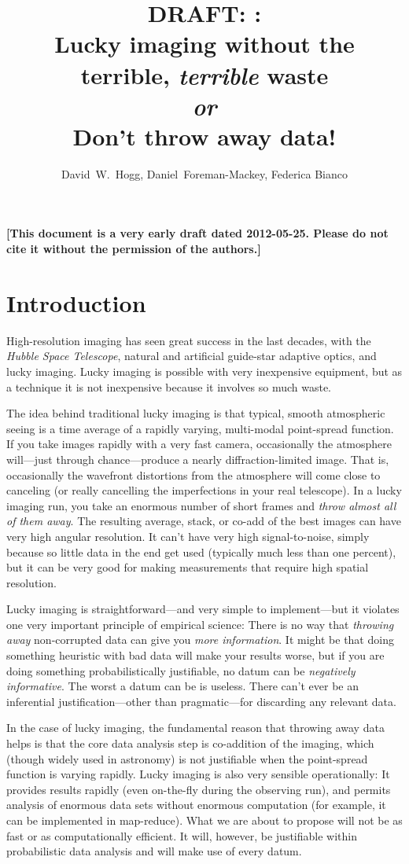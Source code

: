 \documentclass[12pt,preprint]{aastex}
\title{DRAFT: \TheThresher: \\
  Lucky imaging without the terrible, \emph{terrible} waste \\
  \textit{or} \\
  Don't throw away data!}
\author{
  David~W.~Hogg\altaffilmark{\ref{CCPP},\ref{MPIA},\ref{email}},
  Daniel~Foreman-Mackey\altaffilmark{\ref{CCPP}},
  Federica Bianco\altaffilmark{\ref{CCPP},\ref{LCOGT}}
}
\newcommand{\project}[1]{\textsl{#1}}
\begin{document}
\textbf{[This document is a very early draft dated 2012-05-25.  Please do not cite it without the permission of the authors.]}

\section{Introduction}

High-resolution imaging has seen great success in the last decades,
with the \project{Hubble Space Telescope}, natural and artificial
guide-star adaptive optics, and lucky imaging.  Lucky imaging is
possible with very inexpensive equipment, but as a technique it is not
inexpensive because it involves so much waste.

The idea behind traditional lucky imaging is that typical, smooth
atmospheric seeing is a time average of a rapidly varying, multi-modal
point-spread function.  If you take images rapidly with a very fast
camera, occasionally the atmosphere will---just through
chance---produce a nearly diffraction-limited image.  That is,
occasionally the wavefront distortions from the atmosphere will come
close to canceling (or really cancelling the imperfections in your
real telescope).  In a lucky imaging run, you take an enormous number
of short frames and \emph{throw almost all of them away}.  The
resulting average, stack, or co-add of the best images can have very
high angular resolution.  It can't have very high signal-to-noise,
simply because so little data in the end get used (typically much less
than one percent), but it can be very good for making measurements
that require high spatial resolution.

Lucky imaging is straightforward---and very simple to implement---but
it violates one very important principle of empirical science: There
is no way that \emph{throwing away} non-corrupted data can give you
\emph{more information}.  It might be that doing something heuristic
with bad data will make your results worse, but if you are doing
something probabilistically justifiable, no datum can be
\emph{negatively informative}.  The worst a datum can be is useless.
There can't ever be an inferential justification---other than
pragmatic---for discarding any relevant data.

In the case of lucky imaging, the fundamental reason that throwing
away data helps is that the core data analysis step is co-addition of
the imaging, which (though widely used in astronomy) is not
justifiable when the point-spread function is varying rapidly.  Lucky
imaging is also very sensible operationally: It provides results
rapidly (even on-the-fly during the observing run), and permits
analysis of enormous data sets without enormous computation (for
example, it can be implemented in map-reduce).  What we are about to
propose will not be as fast or as computationally efficient.  It will,
however, be justifiable within probabilistic data analysis and will
make use of every datum.
\end{document}

